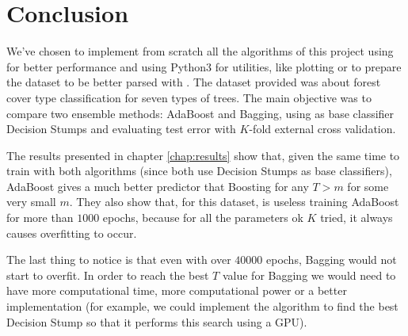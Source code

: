 \chapter{Conclusion}
We've chosen to implement from scratch all the algorithms of this project using  for better performance and using Python3 for utilities, like plotting or to prepare the dataset to be better parsed with \CC. The dataset provided was about forest cover type classification for seven types of trees. The main objective was to compare two ensemble methods: AdaBoost and Bagging, using as base classifier Decision Stumps and evaluating test error with $K$-fold external cross validation.

The results presented in chapter \ref{chap:results} show that, given the same time to train with both algorithms (since both use Decision Stumps as base classifiers), AdaBoost gives a much better predictor that Boosting for any $T > m$ for some very small $m$. They also show that, for this dataset, is useless training AdaBoost for more than $1000$ epochs, because for all the parameters ok $K$ tried, it always causes overfitting to occur.

The last thing to notice is that even with over $40000$ epochs, Bagging would not start to overfit. In order to reach the best $T$ value for Bagging we would need to have more computational time, more computational power or a better implementation (for example, we could implement the algorithm to find the best Decision Stump so that it performs this search using a GPU).
